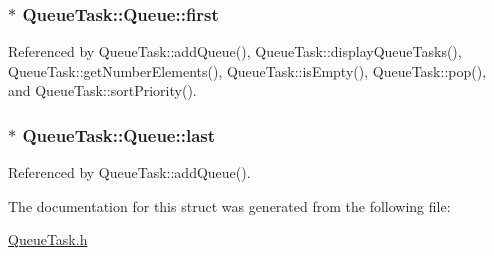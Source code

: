 \subsubsection[{\texorpdfstring{first}{first}}]{$\ast$ Queue\+Task\+::\+Queue\+::first}\hypertarget{structQueueTask_1_1Queue_aefe07ecf93c1276d1436e57656799a41}{}\label{structQueueTask_1_1Queue_aefe07ecf93c1276d1436e57656799a41}


Referenced by Queue\+Task\+::add\+Queue(), Queue\+Task\+::display\+Queue\+Tasks(), Queue\+Task\+::get\+Number\+Elements(), Queue\+Task\+::is\+Empty(), Queue\+Task\+::pop(), and Queue\+Task\+::sort\+Priority().

\subsubsection[{\texorpdfstring{last}{last}}]{$\ast$ Queue\+Task\+::\+Queue\+::last}\hypertarget{structQueueTask_1_1Queue_a886474ef2f7fab2904fb36edf4802350}{}\label{structQueueTask_1_1Queue_a886474ef2f7fab2904fb36edf4802350}


Referenced by Queue\+Task\+::add\+Queue().



The documentation for this struct was generated from the following file\+:\begin{DoxyCompactItemize}
\item 
\hyperlink{QueueTask_8h}{Queue\+Task.\+h}\end{DoxyCompactItemize}
